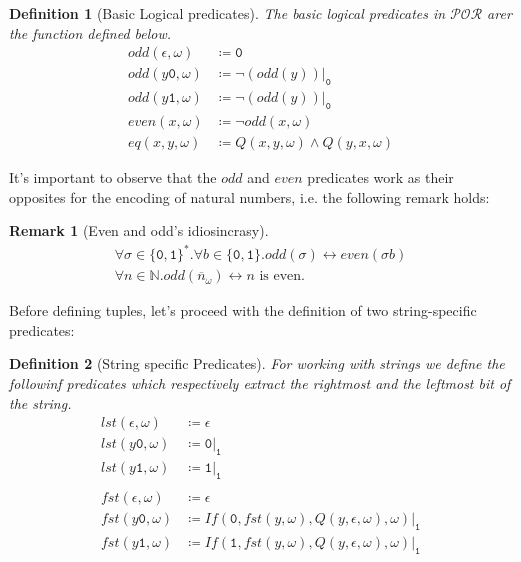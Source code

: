 \documentclass[10pt]{amsart}
\newcommand{\POR}{\mathcal{POR}}
\newcommand{\zero}{\mathtt{0}}
\newcommand{\one}{\mathtt{1}}
\newcommand{\vone}{x}
\newcommand{\vtwo}{y}
\newcommand{\NN}{\mathbb{N}}
\newcommand{\oone}{\omega}
\newtheorem{defn}{Definition}
\newtheorem{remark}{Remark}
\begin{document}
\begin{defn}[Basic Logical predicates]
The basic logical predicates in $\POR$ arer the function defined below.
\begin{align*}
odd(\epsilon, \omega) &\coloneqq \zero\\
odd(\vtwo \zero, \oone) &\coloneqq \lnot (odd(\vtwo))|_{\zero}\\
odd(\vtwo \one, \oone) &\coloneqq \lnot (odd(\vtwo))|_{\zero}\\
even(\vone, \oone)&\coloneqq \lnot odd(\vone, \oone)\\
eq(\vone, \vtwo, \oone)&\coloneqq Q(\vone, \vtwo, \oone)\land Q(\vtwo, \vone, \oone)
\end{align*}
\end{defn}
It's important to observe that the $odd$ and $even$ predicates work as their opposites for the encoding of natural numbers, i.e. the following remark holds:

\begin{remark}[Even and odd's idiosincrasy]
\[
\begin{gathered}
\forall \sigma \in \{\zero, \one\}^*.\forall b \in \{\zero,\one\}. odd(\sigma)\leftrightarrow even (\sigma b)\\
\forall n \in \NN. odd(\overline n_\oone) \leftrightarrow n\text{ is even.}
\end{gathered}
\]
\end{remark}

Before defining tuples, let's proceed with the definition of two string-specific predicates:

\begin{defn}[String specific Predicates]
For working with strings we define the followinf predicates which respectively extract the rightmost and the leftmost bit of the string.
\begin{align*}
lst(\epsilon, \oone) &\coloneqq \epsilon\\
lst(\vtwo \zero, \oone) &\coloneqq \zero|_{\one}\\
lst(\vtwo \one, \oone) &\coloneqq \one|_{\one}\\\\
fst(\epsilon, \oone) &\coloneqq \epsilon\\
fst(\vtwo \zero, \oone) &\coloneqq If(\zero, fst(\vtwo, \oone), Q(\vtwo, \epsilon, \oone), \oone)|_{\one}\\
fst(\vtwo \one, \oone) &\coloneqq If(\one, fst(\vtwo, \oone), Q(\vtwo, \epsilon, \oone), \oone)|_{\one}\\
\end{align*}

\end{defn}
\end{document}
